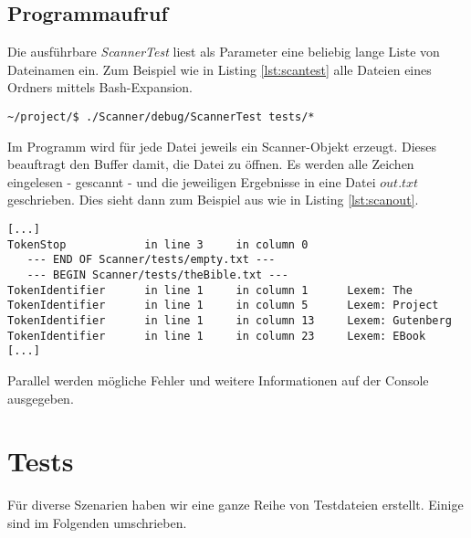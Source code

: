 \documentclass[
a4paper,   %
11pt,      %
oneside,   %
onecolumn, %
final      %
]{article}
\begin{document}
\subsection{Programmaufruf}
Die ausführbare \emph{ScannerTest} liest als Parameter eine beliebig lange Liste von Dateinamen ein. Zum Beispiel wie in Listing \ref{lst:scantest} alle Dateien eines Ordners mittels Bash-Expansion.
\begin{lstlisting}[language=PseudoCode, caption={Aufruf von ScannerTest}, label=lst:scantest]
~/project/$ ./Scanner/debug/ScannerTest tests/*
\end{lstlisting}
Im Programm wird für jede Datei jeweils ein Scanner-Objekt erzeugt. Dieses beauftragt den Buffer damit, die Datei zu öffnen. Es werden alle Zeichen eingelesen - gescannt - und die jeweiligen Ergebnisse in eine Datei $out.txt$ geschrieben. Dies sieht dann zum Beispiel aus wie in Listing \ref{lst:scanout}.
\begin{lstlisting}[language=PseudoCode, firstnumber=57, caption={Dateiausgabe von ScannerTest}, label=lst:scanout]
[...]
TokenStop            in line 3     in column 0
   --- END OF Scanner/tests/empty.txt ---
   --- BEGIN Scanner/tests/theBible.txt ---
TokenIdentifier	     in line 1     in column 1      Lexem: The
TokenIdentifier	     in line 1     in column 5      Lexem: Project
TokenIdentifier	     in line 1     in column 13     Lexem: Gutenberg
TokenIdentifier      in line 1     in column 23     Lexem: EBook
[...]
\end{lstlisting}
Parallel werden mögliche Fehler und weitere Informationen auf der Console ausgegeben.

\section{Tests}
Für diverse Szenarien haben wir eine ganze Reihe von Testdateien erstellt. Einige sind im Folgenden umschrieben.
\end{document}
